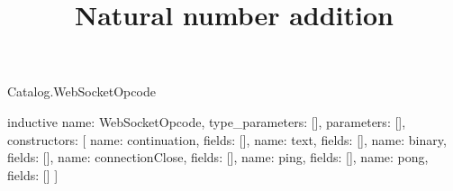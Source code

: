\begin{lexlean}{Catalog.WebSocketOpcode}
\title{Natural number addition}
\begin{semanticmodule}
inductive{
  name: WebSocketOpcode,
  type_parameters: [],
  parameters: [],
  constructors: [
    {name: continuation, fields: []},
    {name: text, fields: []},
    {name: binary, fields: []},
    {name: connectionClose, fields: []},
    {name: ping, fields: []},
    {name: pong, fields: []}
  ]
}
\end{semanticmodule}
\end{lexlean}
